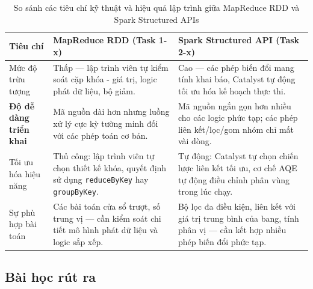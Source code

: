 \begin{table}[H]
\centering
\begin{tabular}{p{3.5cm}p{5cm}p{5cm}}
\toprule
\textbf{Tiêu chí} & \textbf{MapReduce RDD (Task 1-x)} & \textbf{Spark Structured API (Task 2-x)} \\
\midrule
Mức độ trừu tượng & Thấp --- lập trình viên tự kiểm soát cặp khóa - giá trị, logic phát dữ liệu, bộ giảm. & Cao --- các phép biến đổi mang tính khai báo, Catalyst tự động tối ưu hóa kế hoạch thực thi. \\
\midrule
\textbf{Độ dễ dàng triển khai} & Mã nguồn dài hơn nhưng luồng xử lý cực kỳ tường minh đối với các phép toán cơ bản. & Mã nguồn ngắn gọn hơn nhiều cho các logic phức tạp; các phép liên kết/lọc/gom nhóm chỉ mất vài dòng. \\
\midrule
Tối ưu hóa hiệu năng & Thủ công: lập trình viên tự chọn thiết kế khóa, quyết định sử dụng \texttt{reduceByKey} hay \texttt{groupByKey}. & Tự động: Catalyst tự chọn chiến lược liên kết tối ưu, cơ chế AQE tự động điều chỉnh phân vùng trong lúc chạy. \\
\midrule
Sự phù hợp bài toán & Các bài toán cửa sổ trượt, số trung vị --- cần kiểm soát chi tiết mô hình phát dữ liệu và logic sắp xếp. & Bộ lọc đa điều kiện, liên kết với giá trị trung bình của bang, tính phân vị --- cần kết hợp nhiều phép biến đổi phức tạp. \\
\bottomrule
\end{tabular}
\caption{So sánh các tiêu chí kỹ thuật và hiệu quả lập trình giữa MapReduce RDD và Spark Structured APIs}
\label{tab:mapreduce_vs_spark_structured}
\end{table}

\subsection{Bài học rút ra}

